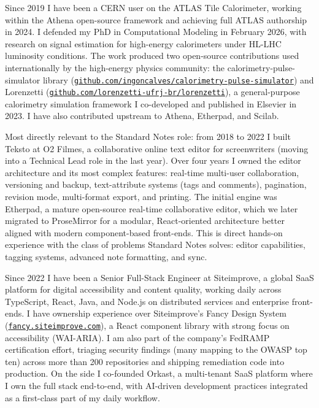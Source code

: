 \documentclass[11pt,a4paper]{article}
\begin{document}
Since 2019 I have been a CERN user on the ATLAS Tile Calorimeter, working within the Athena open-source framework and achieving full ATLAS authorship in 2024. I defended my PhD in Computational Modeling in February 2026, with research on signal estimation for high-energy calorimeters under HL-LHC luminosity conditions. The work produced two open-source contributions used internationally by the high-energy physics community: the calorimetry-pulse-simulator library (\href{https://github.com/ingoncalves/calorimetry-pulse-simulator}{\nolinkurl{github.com/ingoncalves/calorimetry-pulse-simulator}}) and Lorenzetti (\href{https://github.com/lorenzetti-ufrj-br/lorenzetti}{\nolinkurl{github.com/lorenzetti-ufrj-br/lorenzetti}}), a general-purpose calorimetry simulation framework I co-developed and published in Elsevier in 2023. I have also contributed upstream to Athena, Etherpad, and Scilab.

Most directly relevant to the Standard Notes role: from 2018 to 2022 I built Teksto at O2 Filmes, a collaborative online text editor for screenwriters (moving into a Technical Lead role in the last year). Over four years I owned the editor architecture and its most complex features: real-time multi-user collaboration, versioning and backup, text-attribute systems (tags and comments), pagination, revision mode, multi-format export, and printing. The initial engine was Etherpad, a mature open-source real-time collaborative editor, which we later migrated to ProseMirror for a modular, React-oriented architecture better aligned with modern component-based front-ends. This is direct hands-on experience with the class of problems Standard Notes solves: editor capabilities, tagging systems, advanced note formatting, and sync.

Since 2022 I have been a Senior Full-Stack Engineer at Siteimprove, a global SaaS platform for digital accessibility and content quality, working daily across TypeScript, React, Java, and Node.js on distributed services and enterprise front-ends. I have ownership experience over Siteimprove's Fancy Design System (\href{https://fancy.siteimprove.com}{\nolinkurl{fancy.siteimprove.com}}), a React component library with strong focus on accessibility (WAI-ARIA). I am also part of the company's FedRAMP certification effort, triaging security findings (many mapping to the OWASP top ten) across more than 200 repositories and shipping remediation code into production. On the side I co-founded Orkast, a multi-tenant SaaS platform where I own the full stack end-to-end, with AI-driven development practices integrated as a first-class part of my daily workflow.
\end{document}
